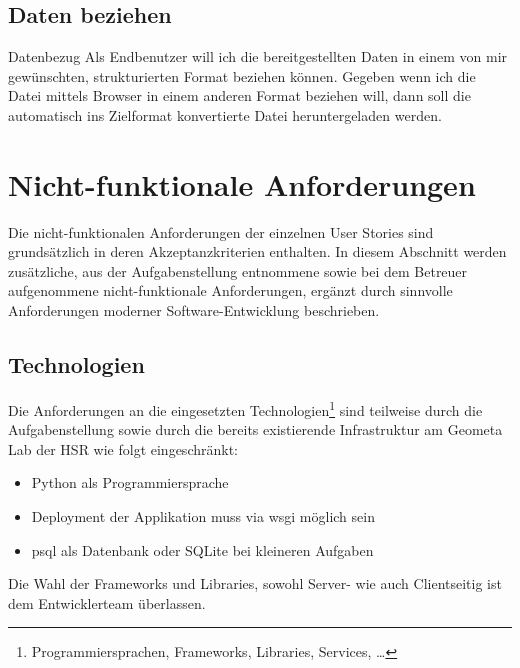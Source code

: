 \subsection{Daten beziehen}

\begin{scrumepic}[label=epic:pd:datenbezug]{Datenbezug}
	Als Endbenutzer will ich die bereitgestellten Daten in einem von mir gewünschten, strukturierten Format beziehen können.
	\storyacceptance	
	Gegeben
	wenn ich die Datei mittels Browser in einem anderen Format beziehen will, dann soll die automatisch ins Zielformat konvertierte Datei heruntergeladen werden.
\end{scrumepic}



\section{Nicht-funktionale Anforderungen}

Die nicht-funktionalen Anforderungen der einzelnen User Stories sind grundsätzlich in deren Akzeptanzkriterien enthalten.
In diesem Abschnitt werden zusätzliche, aus der Aufgabenstellung entnommene sowie bei dem Betreuer aufgenommene nicht-funktionale Anforderungen, ergänzt durch sinnvolle Anforderungen moderner Software-Entwicklung beschrieben.

\subsection{Technologien}
Die Anforderungen an die eingesetzten Technologien\footnote{Programmiersprachen, Frameworks, Libraries, Services, \dots} sind teilweise durch die Aufgabenstellung sowie durch die bereits existierende Infrastruktur am Geometa Lab der HSR wie folgt eingeschränkt:

\begin{itemize}
	\item Python als Programmiersprache
	\item Deployment der Applikation muss via \gls{wsgi} möglich sein
	\item \gls{psql} als Datenbank oder SQLite bei kleineren Aufgaben
\end{itemize}


Die Wahl der Frameworks und Libraries, sowohl Server- wie auch Clientseitig ist dem Entwicklerteam überlassen.

